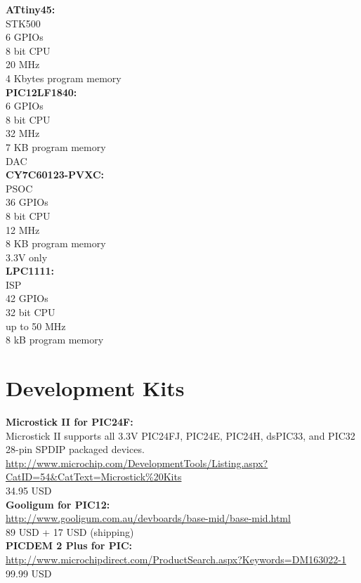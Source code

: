 \textbf{ATtiny45:}\\
STK500\\
6 GPIOs\\
8 bit CPU\\
20 MHz\\
4 Kbytes program memory\\

\textbf{PIC12LF1840:}\\
6 GPIOs\\
8 bit CPU\\
32 MHz\\
7 KB program memory\\
DAC\\

\textbf{CY7C60123-PVXC:}\\
PSOC\\
36 GPIOs\\
8 bit CPU\\
12 MHz\\
8 KB program memory\\
3.3V only \\

\textbf{LPC1111:}\\
ISP\\
42 GPIOs\\
32 bit CPU\\
up to 50 MHz\\
8 kB program memory\\


\chapter{Development Kits}
\textbf{Microstick II for PIC24F:}\\
Microstick II supports all 3.3V PIC24FJ, PIC24E, PIC24H, dsPIC33, and PIC32 28-pin SPDIP packaged devices.\\
\url{http://www.microchip.com/DevelopmentTools/Listing.aspx?CatID=54&CatText=Microstick\%20Kits}\\
34.95 USD\\

\textbf{Gooligum for PIC12:}\\
\url{http://www.gooligum.com.au/devboards/base-mid/base-mid.html}\\
89 USD + 17 USD (shipping)\\

\textbf{PICDEM 2 Plus for PIC:}\\
\url{http://www.microchipdirect.com/ProductSearch.aspx?Keywords=DM163022-1}\\
99.99 USD\\

